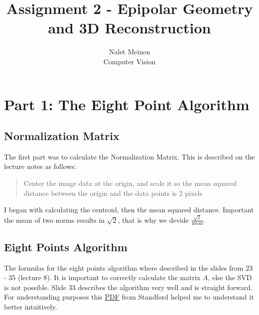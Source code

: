 \documentclass[12pt]{article}
\begin{document}


\title{Assignment 2 - Epipolar Geometry and 3D Reconstruction}%
\author{Nalet Meinen \\ %
Computer Vision
}

\maketitle

\section{Part 1: The Eight Point Algorithm}

\subsection{Normalization Matrix}
The first part was to calculate the Normalization Matrix. This is described on the lecture notes as follows:
\begin{quote}
    Center the image data at the origin, and scale it so
    the mean squared distance between the origin and
    the data points is 2 pixels
\end{quote}

I began with calculating the centroid, then the mean squared distance. Important the mean of two norms results
in $\sqrt{2}$, that is why we devide $\frac{\sqrt{2}}{\mathrm{mean}}$.

\subsection{Eight Points Algorithm}

The formulas for the eight points algorithm where described in the slides from 23 - 35 (lecture 8). 
It is important to correctly calculate the matrix $A$, else the SVD is not possible. Slide 33 describes the algorithm
very well and is straight forward. For understanding purposes this 
\href{https://web.stanford.edu/class/cs231a/course_notes/03-epipolar-geometry.pdf}{PDF} from Standford
helped me to understand it better intuitively.
\end{document}
